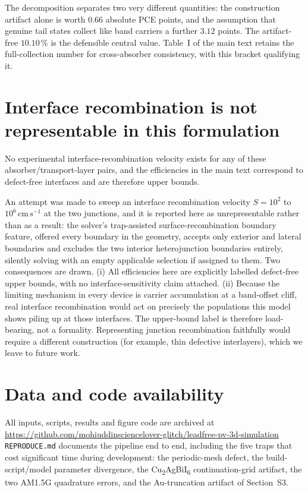 \documentclass[lettersize,journal,onecolumn]{IEEEtran}
\newcommand{\CABI}{Cu\textsubscript{2}AgBiI\textsubscript{6}}
\begin{document}
The decomposition separates two very different quantities: the construction
artifact alone is worth $0.66$ absolute PCE points, and the assumption that
genuine tail states collect like band carriers a further $3.12$ points. The
artifact-free $10.10\,\%$ is the defensible central value. Table~I of the
main text retains
the full-collection number for cross-absorber consistency, with this bracket
qualifying it.

\section{Interface recombination is not representable in this formulation}
No experimental interface-recombination velocity exists for any of these
absorber/transport-layer pairs, and the efficiencies in the main text
correspond to defect-free interfaces and are therefore upper bounds.

An attempt was made to sweep an interface recombination velocity
$S = 10^2$ to $10^6\,\mathrm{cm\,s^{-1}}$ at the two junctions, and it is
reported here as unrepresentable rather than as a result: the solver's
trap-assisted surface-recombination boundary feature, offered every boundary
in the geometry, accepts only exterior and lateral boundaries and excludes
the two interior heterojunction boundaries entirely, silently solving with an
empty applicable selection if assigned to them. Two consequences are drawn.
(i) All efficiencies here are explicitly labelled defect-free upper bounds,
with no interface-sensitivity claim attached. (ii) Because the limiting
mechanism in every device is carrier accumulation at a band-offset cliff,
real interface recombination would act on precisely the populations this
model shows piling up at those interfaces. The upper-bound label is
therefore load-bearing, not a formality. Representing junction recombination
faithfully would require a different construction (for example, thin
defective interlayers), which we leave to future work.

\section{Data and code availability}
All inputs, scripts, results and figure code are archived at\\
{\footnotesize\url{https://github.com/mohiuddinsciencelover-glitch/leadfree-pv-3d-simulation}}
\texttt{REPRODUCE.md} documents the pipeline end to end, including the five
traps that cost significant time during development: the periodic-mesh defect,
the build-script/model parameter divergence, the \CABI{} continuation-grid
artifact, the two AM1.5G quadrature errors, and the Au-truncation artifact of
Section~S3.



\end{document}
